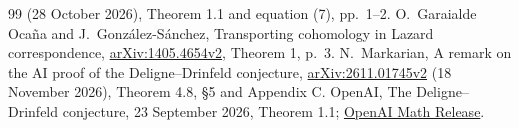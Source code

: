 \documentclass[11pt]{article}
\theoremstyle{definition}
\theoremstyle{remark}
\begin{document}
\begin{thebibliography}{99}
(28 October 2026), Theorem 1.1 and equation (7), pp.~1--2.
 O.~Garaialde Oca\~na and J.~Gonz\'alez-S\'anchez,
Transporting cohomology in Lazard correspondence,
\href{https://arxiv.org/abs/1405.4654}{arXiv:1405.4654v2},
Theorem 1, p.~3.
 N.~Markarian, A remark on the AI proof of the
Deligne--Drinfeld conjecture,
\href{https://arxiv.org/abs/2611.01745}{arXiv:2611.01745v2}
(18 November 2026), Theorem 4.8, \S5 and Appendix C.
 OpenAI, The Deligne--Drinfeld conjecture, 23 September
2026, Theorem 1.1; \href{https://github.com/openai/math/blob/main/preprints/The-Deligne-Drinfeld-conjecture-September-23-2026/paper.pdf}{OpenAI Math Release}.
\end{thebibliography}
\end{document}
